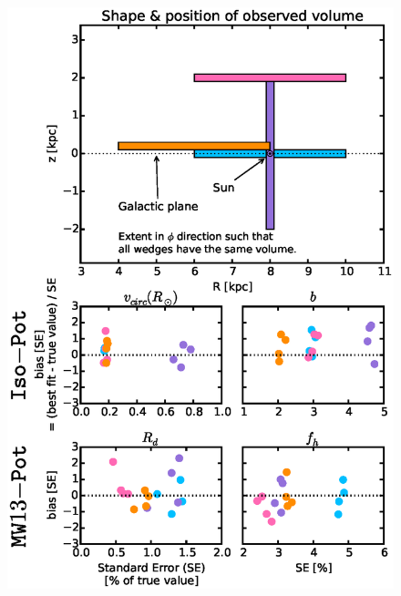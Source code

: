 \documentclass[iop,revtex4]{emulateapj}
\begin{document}
\begin{figure}[!htbp]
\centering
\includegraphics[width=\columnwidth]{figs/wedFlexVol_bias_vs_SE.eps}

\end{figure}
\end{document}
